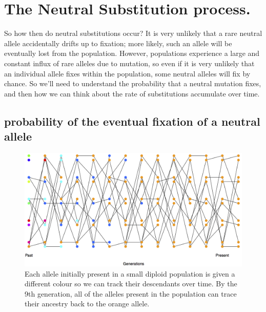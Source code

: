 \section{The Neutral Substitution process.} 
So how then do neutral substitutions occur? It is very unlikely that a rare
neutral allele accidentally drifts up to fixation; more likely, such an allele
will be eventually lost from the population. However, populations experience a
large and constant influx of rare alleles due to mutation, so even if it is
very unlikely that an individual allele fixes within the population, some
neutral alleles will fix by chance. So we'll need to understand the
probability that a neutral mutation fixes, and then how we can think
about the rate of substitutions accumulate over time.\\




\subsection{probability of the eventual fixation of a neutral allele}
\begin{figure}
\begin{center}
  \includegraphics[width = \textwidth]{figures/Substitution_sim.png}
\end{center}
\caption{Each allele initially present in a small diploid population is
  given a different colour so we can track their descendants over
  time. By the 9th generation, all of the alleles present in the
  population can trace their ancestry back to the orange allele. } \label{fig:subs_simulation}
\end{figure}

